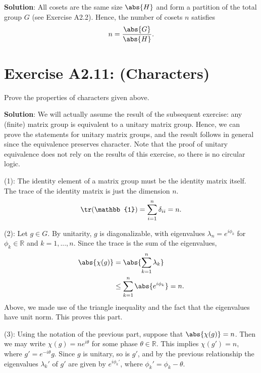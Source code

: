\documentclass{book}
\begin{document}
    \textbf{Solution}: All cosets are the same size $\abs{H}$ and form a partition of the total group $G$ (see Exercise A2.2). Hence, the number of cosets $n$ satisfies
    \begin{align}
        n = \frac{\abs{G}}{\abs{H}}.
    \end{align}

\section*{Exercise A2.11: (Characters)}
    Prove the properties of characters given above.
    
    \textbf{Solution}: We will actually assume the result of the subsequent exercise: any (finite) matrix group is equivalent to a unitary matrix group. Hence, we can prove the statements for unitary matrix groups, and the result follows in general since the equivalence preserves character. Note that the proof of unitary equivalence does not rely on the results of this exercise, so there is no circular logic. 
    
    (1): The identity element of a matrix group must be the identity matrix itself. The trace of the identity matrix is just the dimension $n$.
    \begin{align}
        \tr(\mathbb{1}) = \sum_{i=1}^n \delta_{ii} = n.
    \end{align}
    
    (2): Let $g\in G$. By unitarity, $g$ is diagonalizable, with eigenvalues $\lambda_n = e^{i\phi_k}$ for $\phi_k\in \mathbb{R}$ and $k=1,...,n$. Since the trace is the sum of the eigenvalues,
    \begin{align}
        \abs{\chi(g)} &= \abs{\sum_{k=1}^n \lambda_k} \\
        &\leq \sum_{k=1}^n \abs{e^{i\phi_k}} = n.
    \end{align}
    Above, we made use of the triangle inequality and the fact that the eigenvalues have unit norm. This proves this part.
    
    (3): Using the notation of the previous part, suppose that $\abs{\chi(g)} = n$. Then we may write $\chi(g) = n e^{i\theta}$ for some phase $\theta\in \mathbb{R}$. This implies $\chi(g') = n$, where $g' = e^{-i\theta} g$. Since $g$ is unitary, so is $g'$, and by the previous relationship the eigenvalues $\lambda_k'$ of $g'$ are given by $e^{i\phi_k'}$, where $\phi_k'=\phi_k-\theta$. 
    
\end{document}
